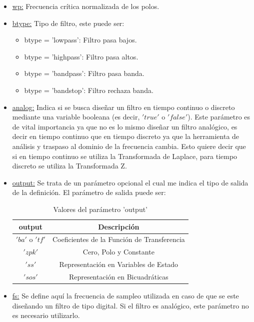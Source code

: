 \documentclass[12pt,a4paper]{article}
\begin{document}
\begin{itemize}
    \item \underline{wp:} Frecuencia crítica normalizada de los polos.
    \item \underline{btype:} Tipo de filtro, este puede ser:
    \begin{itemize}
        \item btype = 'lowpass': Filtro pasa bajos.
        \item btype = 'highpass': Filtro pasa altos.
        \item btype = 'bandpass': Filtro pasa banda.
        \item btype = 'bandstop': Filtro rechaza banda.
    \end{itemize}
    \item \underline{analog:} Indica si se busca diseñar un filtro en tiempo continuo o discreto mediante una variable booleana (es decir, $'true'$ o $'false'$). Este parámetro es de vital importancia ya que no es lo mismo diseñar un filtro analógico, es decir en tiempo continuo que en tiempo discreto ya que la herramienta de análisis y traspaso al dominio de la frecuencia cambia. Esto quiere decir que si en tiempo continuo se utiliza la Transformada de Laplace, para tiempo discreto se utiliza la Transformada Z.
    \item \underline{output:} Se trata de un parámetro opcional el cual me indica el tipo de salida de la definición. El parámetro de salida puede ser:
    \begin{table}[H]
        \centering
        \begin{tabular}{|c|c|} \hline
            \textbf{output} & \textbf{Descripción} \\ \hline
             $'ba'$ o $'tf'$ & Coeficientes de la Función de Transferencia \\ \hline
             $'zpk'$ & Cero, Polo y Constante \\ \hline
             $'ss'$ & Representación en Variables de Estado \\ \hline
             $'sos'$ & Representación en Bicuadráticas \\ \hline
        \end{tabular}
        \caption{Valores del parámetro 'output'}
        \label{tab:tb_3}
    \end{table}
    \item \underline{fs:} Se define aquí la frecuencia de sampleo utilizada en caso de que se este diseñando un filtro de tipo digital. Si el filtro es analógico, este parámetro no es necesario utilizarlo.
\end{itemize}
\end{document}
